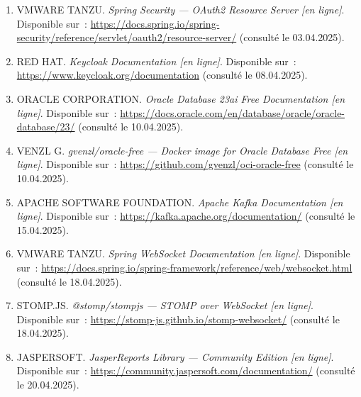 \begin{enumerate}
  \item VMWARE TANZU.
        \textit{Spring Security — OAuth2 Resource Server [en ligne]}.
        Disponible sur~: \url{https://docs.spring.io/spring-security/reference/servlet/oauth2/resource-server/}
        (consulté le 03.04.2025).

  \item RED HAT.
        \textit{Keycloak Documentation [en ligne]}.
        Disponible sur~: \url{https://www.keycloak.org/documentation}
        (consulté le 08.04.2025).

  \item ORACLE CORPORATION.
        \textit{Oracle Database 23ai Free Documentation [en ligne]}.
        Disponible sur~: \url{https://docs.oracle.com/en/database/oracle/oracle-database/23/}
        (consulté le 10.04.2025).

  \item VENZL G.
        \textit{gvenzl/oracle-free — Docker image for Oracle Database Free [en ligne]}.
        Disponible sur~: \url{https://github.com/gvenzl/oci-oracle-free}
        (consulté le 10.04.2025).

  \item APACHE SOFTWARE FOUNDATION.
        \textit{Apache Kafka Documentation [en ligne]}.
        Disponible sur~: \url{https://kafka.apache.org/documentation/}
        (consulté le 15.04.2025).

  \item VMWARE TANZU.
        \textit{Spring WebSocket Documentation [en ligne]}.
        Disponible sur~: \url{https://docs.spring.io/spring-framework/reference/web/websocket.html}
        (consulté le 18.04.2025).

  \item STOMP.JS.
        \textit{@stomp/stompjs — STOMP over WebSocket [en ligne]}.
        Disponible sur~: \url{https://stomp-js.github.io/stomp-websocket/}
        (consulté le 18.04.2025).

  \item JASPERSOFT.
        \textit{JasperReports Library — Community Edition [en ligne]}.
        Disponible sur~: \url{https://community.jaspersoft.com/documentation/}
        (consulté le 20.04.2025).


\end{enumerate}
